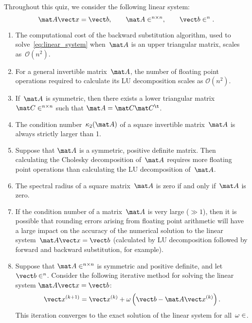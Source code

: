 \documentclass{article}
\begin{document}
Throughout this quiz,
we consider the following linear system:
\begin{equation}
    \label{eq:linear_system}
    \mat A \vect x = \vect b,
    \qquad \mat A \in \real^{n \times n},
    \qquad \vect b \in \real^n.
\end{equation}
\begin{enumerate}

    \item
        The computational cost of the backward substitution algorithm,
        used to solve~\eqref{eq:linear_system} when~$\mat A$ is an upper triangular matrix,
        scales as~$\mathcal O(n^2)$.

    \item
        For a general invertible matrix~$\mat A$,
        the number of floating point operations required to calculate its LU decomposition scales as $\mathcal O(n^2)$.

    \item
        If~$\mat A$ is symmetric,
        then there exists a lower triangular matrix $\mat C \in \real^{n \times n}$ such that $\mat A = \mat C \mat C^\t$.

    \item
        The condition number~$\kappa_2(\mat A)$ of a square invertible matrix~$\mat A$ is always strictly larger than 1.

    \item
        Suppose that $\mat A$ is a symmetric, positive definite matrix.
        Then calculating the Cholesky decomposition of~$\mat A$ requires more floating point operations than calculating the LU decomposition of~$\mat A$.

    \item
        The spectral radius of a square matrix~$\mat A$ is zero if and only if~$\mat A$ is zero.

    \item
        If the condition number of a matrix~$\mat A$ is very large ($\gg 1$),
        then it is possible that rounding errors arising from floating point arithmetic will have a large impact on
        the accuracy of the numerical solution to the linear system~$\mat A \vect x = \vect b$
        (calculated by LU decomposition followed by forward and backward substitution, for example).

    \item
        Suppose that $\mat A \in \real^{n \times n}$ is symmetric and positive definite,
        and let $\vect b \in \real^n$.
        Consider the following iterative method for solving the linear system $\mat A \vect x = \vect b$:
        \begin{equation}
            \label{eq:richardson}
            \vect x^{(k+1)} = \vect x^{(k)} + \omega \left( \vect b - \mat A \vect x^{(k)} \right).
        \end{equation}
        This iteration converges to the exact solution of the linear system for all~$\omega \in \real$.


\end{enumerate}
\end{document}
